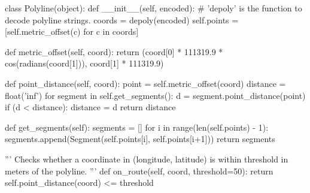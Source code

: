 \begin{code}[label={lst:sprint3-polyline}, caption={The \texttt{Polyline} Class}, language={Python}, style={PythonDoc}]
class Polyline(object):
	def __init__(self, encoded):
		# 'depoly' is the function to decode polyline strings.
		coords = depoly(encoded)
		self.points = [self.metric_offset(c) for c in coords]

	def metric_offset(self, coord):
		return (coord[0] * 111319.9 * cos(radians(coord[1])), 
			    coord[1] * 111319.9)

	def point_distance(self, coord):
		point = self.metric_offset(coord)
		distance = float('inf')
		for segment in self.get_segments():
			d = segment.point_distance(point)
			if (d < distance):
			distance = d
		return distance

	def get_segments(self):
		segments = []
		for i in range(len(self.points) - 1):
			segments.append(Segment(self.points[i], self.points[i+1]))
		return segments

	'''
	Checks whether a coordinate in (longitude, latitude) 
	is within threshold in meters of the polyline.
	'''
	def on_route(self, coord, threshold=50):
		return self.point_distance(coord) <= threshold
\end{code}
